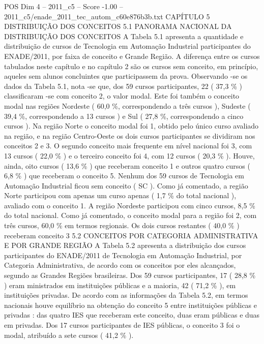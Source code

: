 \begin{textsample}{POS Dim 4 – 2011\_c5 – Score -1.00 – 2011\_c5/enade\_2011\_tec\_autom\_c60e876b3b.txt}  \label{ex:f4_pos_242}
CAPÍTULO 5 DISTRIBUIÇÃO DOS CONCEITOS 5.1 PANORAMA NACIONAL DA DISTRIBUIÇÃO DOS CONCEITOS A Tabela 5.1 apresenta a quantidade e distribuição de cursos de Tecnologia em Automação Industrial participantes do ENADE/2011, por faixa de conceito e Grande Região.
A diferença entre os cursos tabulados neste capítulo e no capítulo 2 são os cursos sem conceito, em princípio, aqueles sem alunos concluintes que participassem da prova.
Observando -se os dados da Tabela 5.1, nota -se que, dos 59 cursos participantes, 22 ( 37,3 \% ) classificaram -se com conceito 2, o valor modal.
Este foi também o conceito modal nas regiões Nordeste ( 60,0 \%, correspondendo a três cursos ), Sudeste ( 39,4 \%, correspondendo a 13 cursos ) e Sul ( 27,8 \%, correspondendo a cinco cursos ).
Na região Norte o conceito modal foi 1, obtido pelo único curso avaliado na região, e na região Centro-Oeste os dois cursos participantes se dividiram nos conceitos 2 e 3.
O segundo conceito mais frequente em nível nacional foi 3, com 13 cursos ( 22,0 \% ) e o terceiro conceito foi 4, com 12 cursos ( 20,3 \% ).
Houve, ainda, oito cursos ( 13,6 \% ) que receberam conceito 1 e outros quatro cursos ( 6,8 \% ) que receberam o conceito 5.
Nenhum dos 59 cursos de Tecnologia em Automação Industrial ficou sem conceito ( SC ).
Como já comentado, a região Norte participou com apenas um curso apenas ( 1,7 \% do total nacional ), avaliado com o conceito 1.
A região Nordeste participou com cinco cursos, 8,5 \% do total nacional.
Como já comentado, o conceito modal para a região foi 2, com três cursos, 60,0 \% em termos regionais.
Os dois cursos restantes ( 40,0 \% ) receberam conceito 3 5.2 CONCEITOS POR CATEGORIA ADMINISTRATIVA E POR GRANDE REGIÃO A Tabela 5.2 apresenta a distribuição dos cursos participantes do ENADE/2011 de Tecnologia em Automação Industrial, por Categoria Administrativa, de acordo com os conceitos por eles alcançados, segundo as Grandes Regiões brasileiras.
Dos 59 cursos participantes, 17 ( 28,8 \% ) eram ministrados em instituições públicas e a maioria, 42 ( 71,2 \% ), em instituições privadas.
De acordo com as informações da Tabela 5.2, em termos nacionais houve equilíbrio na obtenção do conceito 5 entre instituições públicas e privadas : das quatro IES que receberam este conceito, duas eram públicas e duas em privadas.
Dos 17 cursos participantes de IES públicas, o conceito 3 foi o modal, atribuído a sete cursos ( 41,2 \% ).

\end{textsample}
